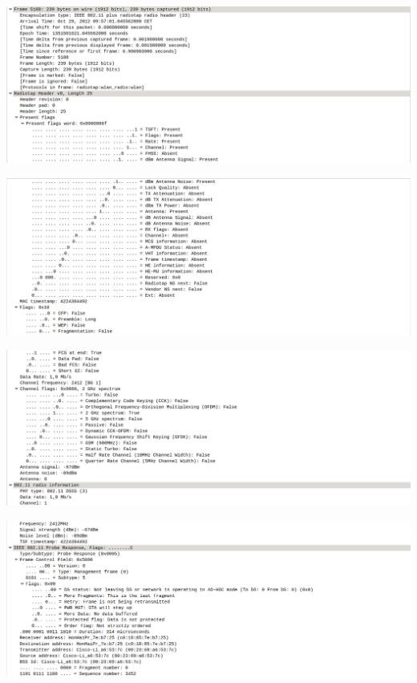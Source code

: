 \documentclass{article}
\begin{document}
\begin{center}
\includegraphics[scale=0.3]{WLAN/probres1.png}
\end{center}
\begin{center}
\includegraphics[scale=0.3]{WLAN/probres2.png}
\end{center}
\begin{center}
\includegraphics[scale=0.3]{WLAN/probres3.png}
\end{center}
\begin{center}
\includegraphics[scale=0.3]{WLAN/probres4.png}
\end{center}
\end{document}
